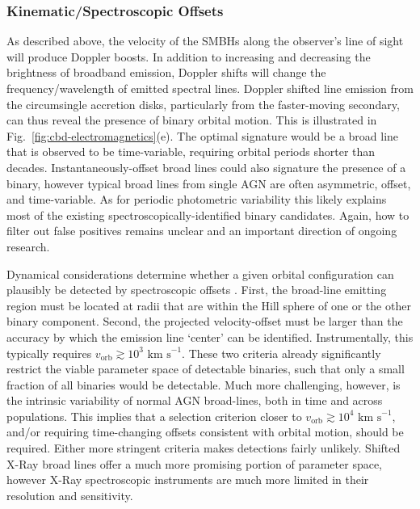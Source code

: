 \documentclass[onecolumn,authoryear]{els-mrw}
\begin{document}
\subsubsection{Kinematic/Spectroscopic Offsets}

As described above, the velocity of the SMBHs along the observer's line of sight will produce Doppler boosts.  In addition to increasing and decreasing the brightness of broadband emission, Doppler shifts will change the frequency/wavelength of emitted spectral lines.  Doppler shifted line emission from the circumsingle accretion disks, particularly from the faster-moving secondary, can thus reveal the presence of binary orbital motion.  This is illustrated in Fig.~\ref{fig:cbd-electromagnetics}(e).  The optimal signature would be a broad line that is observed to be time-variable, requiring orbital periods shorter than decades.  Instantaneously-offset broad lines could also signature the presence of a binary, however typical broad lines from single AGN are often asymmetric, offset, and time-variable.  As for periodic photometric variability this likely explains most of the existing spectroscopically-identified binary candidates.  Again, how to filter out false positives remains unclear and an important direction of ongoing research.

Dynamical considerations determine whether a given orbital configuration can plausibly be detected by spectroscopic offsets \citep{Kelley+2021}.  First, the broad-line emitting region must be located at radii that are within the Hill sphere of one or the other binary component.  Second, the projected velocity-offset must be larger than the accuracy by which the emission line `center' can be identified.  Instrumentally, this typically requires $v_\textrm{orb} \gtrsim 10^3 \textrm{ km s}^{-1}$.  These two criteria already significantly restrict the viable parameter space of detectable binaries, such that only a small fraction of all binaries would be detectable.  Much more challenging, however, is the intrinsic variability of normal AGN broad-lines, both in time and across populations. This implies that a selection criterion closer to $v_\textrm{orb} \gtrsim 10^4 \textrm{ km s}^{-1}$, and/or requiring time-changing offsets consistent with orbital motion, should be required.  Either more stringent criteria makes detections fairly unlikely.  Shifted X-Ray broad lines offer a much more promising portion of parameter space, however X-Ray spectroscopic instruments are much more limited in their resolution and sensitivity.
\end{document}
